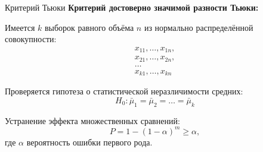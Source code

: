 \documentclass{beamer}
\begin{document}
\begin{frame}{Критерий Тьюки}
    \textbf{Критерий достоверно значимой разности Тьюки:}
    \bigskip

    Имеется $k$ выборок равного объёма $n$
    из нормально распределённой совокупности:
    \begin{gather*}
        x_{11}, \ldots, x_{1n},\\
        x_{21}, \ldots, x_{2n},\\
        \dots\\
        x_{k1}, \ldots, x_{kn}
    \end{gather*}

    Проверяется гипотеза о статистической неразличимости средних:
    \begin{equation*}
        H_0: \bar{\mu}_1=\bar{\mu}_2=\ldots=\bar{\mu}_k
    \end{equation*}

    Устранение эффекта множественных сравнений:
    \begin{equation*}
        P = 1 - (1 - \alpha)^m \geq \alpha,
    \end{equation*}
    где $\alpha$ вероятность ошибки первого рода.
\end{frame}
\end{document}
